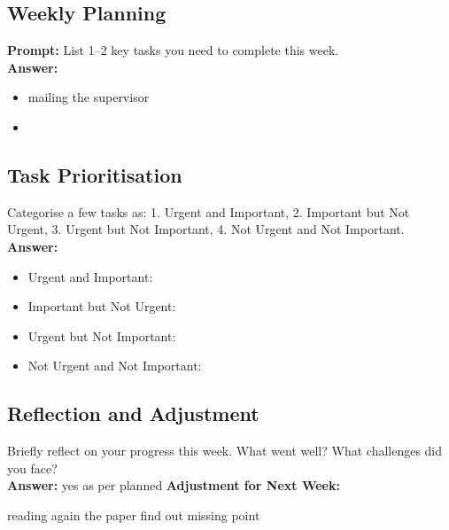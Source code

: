 \documentclass[a4paper,12pt]{article}
\begin{document}
\subsection*{Weekly Planning}
\textbf{Prompt:} List 1–2 key tasks you need to complete this week.\\
\textbf{Answer:}
\begin{itemize}
  Reading out the papers  \item 
   mailing the supervisor  \item 
\end{itemize}

\subsection*{Task Prioritisation}
 Categorise a few tasks as: 1. Urgent and Important, 2. Important but Not Urgent, 3. Urgent but Not Important, 4. Not Urgent and Not Important.\\
\textbf{Answer:}
\begin{itemize}
   Reading out the papers, mailing the supervisor , getting there reply\item Urgent and Important: 
    \item Important but Not Urgent: 
    \item Urgent but Not Important: 
    \item Not Urgent and Not Important: 
\end{itemize}

\subsection*{Reflection and Adjustment}
Briefly reflect on your progress this week. What went well? What challenges did you face?\\
\textbf{Answer:} 
yes as per planned 
\noindent
\textbf{Adjustment for Next Week:} 

reading again the paper  find out missing point
\end{document}
